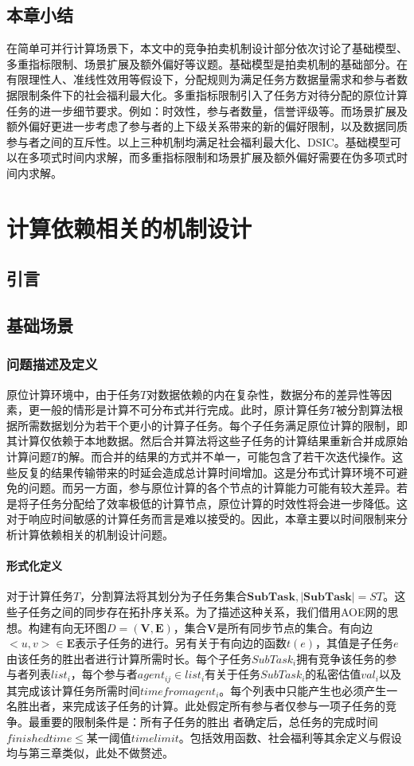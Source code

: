 \documentclass[promaster]{thesis-uestc}
\begin{document}
\section{本章小结}
在简单可并行计算场景下，本文中的竞争拍卖机制设计部分依次讨论了基础模型、多重指标限制、场景扩展及额外偏好等议题。基础模型是拍卖机制的基础部分。在有限理性人、准线性效用等假设下，分配规则为满足任务方数据量需求和参与者数据限制条件下的社会福利最大化。多重指标限制引入了任务方对待分配的原位计算任务的进一步细节要求。例如：时效性，参与者数量，信誉评级等。而场景扩展及额外偏好更进一步考虑了参与者的上下级关系带来的新的偏好限制，以及数据同质参与者之间的互斥性。以上三种机制均满足社会福利最大化、DSIC。基础模型可以在多项式时间内求解，而多重指标限制和场景扩展及额外偏好需要在伪多项式时间内求解。

\chapter{计算依赖相关的机制设计}
\section{引言}
\section{基础场景}
\subsection{问题描述及定义}
原位计算环境中，由于任务$T$对数据依赖的内在复杂性，数据分布的差异性等因素，更一般的情形是计算不可分布式并行完成。此时，原计算任务$T$被分割算法根据所需数据划分为若干个更小的计算子任务。每个子任务满足原位计算的限制，即其计算仅依赖于本地数据。然后合并算法将这些子任务的计算结果重新合并成原始计算问题$T$的解。而合并的结果的方式并不单一，可能包含了若干次迭代操作。这些反复的结果传输带来的时延会造成总计算时间增加。这是分布式计算环境不可避免的问题。而另一方面，参与原位计算的各个节点的计算能力可能有较大差异。若是将子任务分配给了效率极低的计算节点，原位计算的时效性将会进一步降低。这对于响应时间敏感的计算任务而言是难以接受的。因此，本章主要以时间限制来分析计算依赖相关的机制设计问题。

\subsubsection{形式化定义}
对于计算任务$T$，分割算法将其划分为子任务集合$\mathbf{SubTask},|\mathbf{SubTask}| = ST$。这些子任务之间的同步存在拓扑序关系。为了描述这种关系，我们借用AOE网的思想。构建有向无环图$D=(\mathbf{V},\mathbf{E})$，集合$\mathbf{V}$是所有同步节点的集合。有向边$<u,v> \in \mathbf{E}$表示子任务的进行。另有关于有向边的函数$t(e)$，其值是子任务$e$由该任务的胜出者进行计算所需时长。每个子任务$SubTask_i$拥有竞争该任务的参与者列表$list_i$，每个参与者$agent_{ij} \in list_i$有关于任务$SubTask_i$的私密估值$val_i$以及其完成该计算任务所需时间$timefromagent_i$。每个列表中只能产生也必须产生一名胜出者，来完成该子任务的计算。此处假定所有参与者仅参与一项子任务的竞争。最重要的限制条件是：所有子任务的胜出
者确定后，总任务的完成时间$finishedtime \leq $某一阈值$timelimit$。包括效用函数、社会福利等其余定义与假设均与第三章类似，此处不做赘述。
\end{document}
